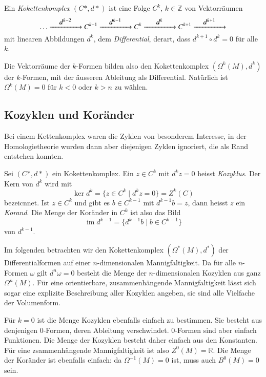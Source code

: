 \begin{definition}[Kokettenkomplex]
%
Ein \emph{Kokettenkomplex} $(C*,d*)$ ist eine Folge $C^k$, $k\in\mathbb{Z}$
von Vektorräumen 
\[
\dots
\xrightarrow{\qquad\clap{$d^{k-2}$}\qquad}
C^{k-1}
\xrightarrow{\qquad\clap{$d^{k-1}$}\qquad}
C^k
\xrightarrow{\qquad\clap{$d^{k}$}\qquad}
C^{k+1}
\xrightarrow{\qquad\clap{$d^{k+1}$}\qquad}
\]
mit linearen Abbildungen $d^k$, dem \emph{Differential},
%
derart, dass $d^{k+1}\circ d^k=0$ für alle $k$.
\end{definition}

Die Vektorräume der $k$-Formen bilden also den Kokettenkomplex
$(\Omega^k(M),d^k)$ der $k$-Formen,
mit der äusseren Ableitung als Differential.
Natürlich ist $\Omega^k(M)=0$ für $k<0$ oder $k>n$ zu wählen.

%
%
\subsection{Kozyklen und Koränder}
Bei einem Kettenkomplex waren die Zyklen von besonderem Interesse,
in der Homologietheorie wurden dann aber diejenigen Zyklen ignoriert,
die als Rand entstehen konnten.

\begin{definition}
Sei $(C*,d*)$ ein Kokettenkomplex.
Ein $z\in C^k$ mit $d^kz=0$ heisst \emph{Kozyklus}.
%
Der Kern von $d^k$ wird mit
\[
\ker d^k = \{ z\in C^k\mid d^kz=0\}
=
Z^k(C)
\]
bezeicnnet.
Ist $z\in C^k$ und gibt es $b\in C^{k-1}$ mit $d^{k-1}b=z$, dann 
heisst $z$ ein \emph{Korand}.
%
Die Menge der Koränder in $C^k$ ist also das Bild
\[
\operatorname{im}d^{k-1}
=
\{
d^{k-1}b\mid b\in C^{k-1}
\}
\]
von $d^{k-1}$.
\end{definition}

Im folgenden betrachten wir den Kokettenkomplex $(\Omega^*(M),d^*)$ 
der Differentialformen auf einer $n$-dimensionalen Mannigfaltigkeit.
Da für alle $n$-Formen $\omega$ gilt $d^n\omega=0$ besteht die Menge
der $n$-dimensionalen Kozyklen aus ganz $\Omega^n(M)$.
Für eine orientierbare, zusammenhängende Mannigfaltigkeit lässt sich
sogar eine explizite Beschreibung aller Kozyklen angeben, sie sind
alle Vielfache der Volumenform.

Für $k=0$ ist die Menge Kozyklen ebenfalls einfach zu bestimmen.
Sie besteht aus denjenigen $0$-Formen, deren Ableitung verschwindet.
0-Formen sind aber einfach Funktionen.
Die Menge der Kozyklen besteht daher einfach aus den Konstanten.
Für eine zsammenhängende Mannigfaltigkeit ist also
$Z^0(M)=\mathbb{R}$.
Die Menge der Koränder ist ebenfalls einfach: da $\Omega^{-1}(M)=0$ ist,
muss auch $B^0(M)=0$ sein.

